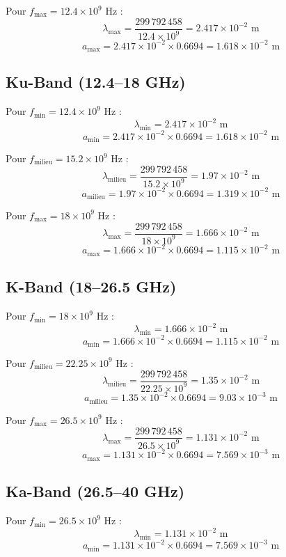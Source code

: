 \documentclass{article}
\begin{document}
Pour \( f_{\text{max}} = 12.4 \times 10^9 \) Hz :
\[
\lambda_{\text{max}} = \frac{299\,792\,458}{12.4 \times 10^9} = 2.417 \times 10^{-2} \text{ m}
\]
\[
a_{\text{max}} = 2.417 \times 10^{-2} \times 0.6694 = 1.618 \times 10^{-2} \text{ m}
\]

\subsection{Ku-Band (12.4–18 GHz)}
Pour \( f_{\text{min}} = 12.4 \times 10^9 \) Hz :
\[
\lambda_{\text{min}} = 2.417 \times 10^{-2} \text{ m}
\]
\[
a_{\text{min}} = 2.417 \times 10^{-2} \times 0.6694 = 1.618 \times 10^{-2} \text{ m}
\]

Pour \( f_{\text{milieu}} = 15.2 \times 10^9 \) Hz :
\[
\lambda_{\text{milieu}} = \frac{299\,792\,458}{15.2 \times 10^9} = 1.97 \times 10^{-2} \text{ m}
\]
\[
a_{\text{milieu}} = 1.97 \times 10^{-2} \times 0.6694 = 1.319 \times 10^{-2} \text{ m}
\]

Pour \( f_{\text{max}} = 18 \times 10^9 \) Hz :
\[
\lambda_{\text{max}} = \frac{299\,792\,458}{18 \times 10^9} = 1.666 \times 10^{-2} \text{ m}
\]
\[
a_{\text{max}} = 1.666 \times 10^{-2} \times 0.6694 = 1.115 \times 10^{-2} \text{ m}
\]

\subsection{K-Band (18–26.5 GHz)}
Pour \( f_{\text{min}} = 18 \times 10^9 \) Hz :
\[
\lambda_{\text{min}} = 1.666 \times 10^{-2} \text{ m}
\]
\[
a_{\text{min}} = 1.666 \times 10^{-2} \times 0.6694 = 1.115 \times 10^{-2} \text{ m}
\]

Pour \( f_{\text{milieu}} = 22.25 \times 10^9 \) Hz :
\[
\lambda_{\text{milieu}} = \frac{299\,792\,458}{22.25 \times 10^9} = 1.35 \times 10^{-2} \text{ m}
\]
\[
a_{\text{milieu}} = 1.35 \times 10^{-2} \times 0.6694 = 9.03 \times 10^{-3} \text{ m}
\]

Pour \( f_{\text{max}} = 26.5 \times 10^9 \) Hz :
\[
\lambda_{\text{max}} = \frac{299\,792\,458}{26.5 \times 10^9} = 1.131 \times 10^{-2} \text{ m}
\]
\[
a_{\text{max}} = 1.131 \times 10^{-2} \times 0.6694 = 7.569 \times 10^{-3} \text{ m}
\]

\subsection{Ka-Band (26.5–40 GHz)}
Pour \( f_{\text{min}} = 26.5 \times 10^9 \) Hz :
\[
\lambda_{\text{min}} = 1.131 \times 10^{-2} \text{ m}
\]
\[
a_{\text{min}} = 1.131 \times 10^{-2} \times 0.6694 = 7.569 \times 10^{-3} \text{ m}
\]
\end{document}
